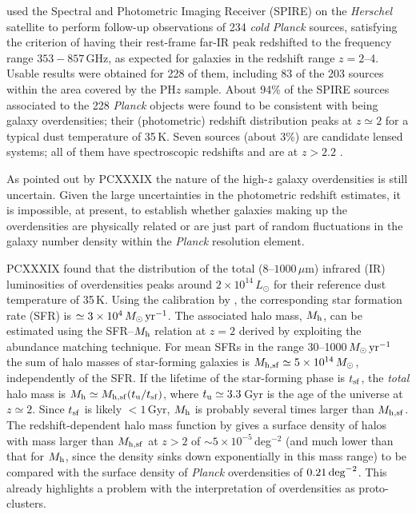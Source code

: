 \documentclass[useAMS,usenatbib]{mn2e}
\begin{document}
\citet{PlanckCollaborationXXVII2015} used the Spectral and Photometric Imaging Receiver (SPIRE) on the \textit{Herschel} satellite to perform follow-up observations of 234 {\it cold} \textit{Planck}
sources, satisfying the criterion of having their rest-frame
far-IR peak redshifted to the frequency range $353-857$\,GHz, as
expected for galaxies in the redshift range $z=2$--4. Usable results
were obtained for 228 of them, including 83 of the 203 sources within
the area covered by the PH$z$ sample. About 94\% of the SPIRE sources
associated to the 228 \textit{Planck} objects were found to be
consistent with being galaxy overdensities; their (photometric) redshift
distribution peaks at $z\simeq 2$ for a typical dust temperature of
35\,K. Seven sources (about 3\%) are candidate lensed systems; all of
them have spectroscopic redshifts and are at $z>2.2$
\citep{Canameras2015}.

As pointed out by PCXXXIX the nature of the high-$z$ galaxy
overdensities is still uncertain. Given the large uncertainties in the
photometric redshift estimates, it is impossible, at present, to
establish whether galaxies making up the overdensities are physically
related or are just part of random fluctuations in the galaxy number
density within the \textit{Planck} resolution element.

PCXXXIX found that the distribution of the total (8--$1000\,\mu$m)
infrared (IR) luminosities of overdensities peaks around $2\times
10^{14}\,L_\odot$ for their reference dust temperature of 35\,K. Using
the calibration by \citet{KennicuttEvans2012}, the corresponding star
formation rate (SFR) is $\simeq 3\times 10^4\,M_\odot\,\hbox{yr}^{-1}$. The associated halo mass, $M_{\rm h}$, can be estimated using the SFR--$M_{\rm h}$ relation at $z=2$ derived by \citet{Aversa2015} exploiting the abundance matching technique. For mean SFRs in the range 30--1000\,$M_\odot\,\hbox{yr}^{-1}$ \citep[the typical SFR of $z\simeq 2$ star-forming galaxies is $\simeq 300\,M_\odot\,\hbox{yr}^{-1}$, see Fig.~9 of][]{Cai2014} the sum of halo masses of star-forming galaxies is $M_{\rm h,sf}\simeq 5\times 10^{14}\,M_\odot$, independently of the SFR. If the lifetime of the star-forming phase is $t_{\rm sf}$, the \textit{total} halo mass is $M_{\rm h}\simeq M_{\rm h,sf}({t_{\rm u}/t_{\rm sf}})$, where $t_{\rm u}\simeq 3.3\,$Gyr is the age of the universe at $z\simeq 2$. Since $t_{\rm sf}$ is likely $< 1\,$Gyr, $M_{\rm h}$ is probably several times larger than $M_{\rm h,sf}$.  The redshift-dependent halo mass function by \cite{ST99} gives a surface density of halos with mass larger than $M_{\rm h,sf}$ at $z>2$ of $\sim5\times10^{-5}$\,deg$^{-2}$ (and much lower than that for $M_{\rm h}$, since the density sinks down exponentially in this mass range) to be compared with the surface density of
\textit{Planck} overdensities of $0.21\,\hbox{deg}^{-2}$. This already
highlights a problem with the interpretation of overdensities as
proto-clusters.
\end{document}
